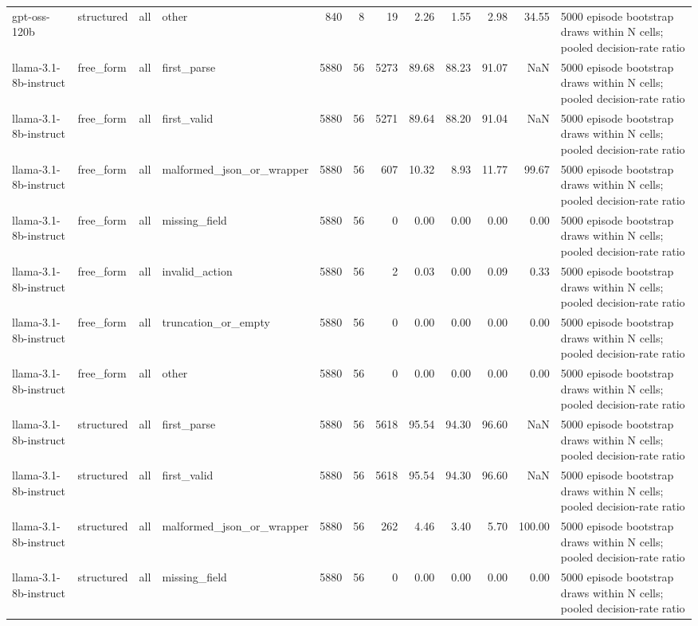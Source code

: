 \begin{tabular}{llllrrrrrrrl}
gpt-oss-120b & structured & all & other & 840 & 8 & 19 & 2.26 & 1.55 & 2.98 & 34.55 & 5000 episode bootstrap draws within N cells; pooled decision-rate ratio \\
llama-3.1-8b-instruct & free\_form & all & first\_parse & 5880 & 56 & 5273 & 89.68 & 88.23 & 91.07 & NaN & 5000 episode bootstrap draws within N cells; pooled decision-rate ratio \\
llama-3.1-8b-instruct & free\_form & all & first\_valid & 5880 & 56 & 5271 & 89.64 & 88.20 & 91.04 & NaN & 5000 episode bootstrap draws within N cells; pooled decision-rate ratio \\
llama-3.1-8b-instruct & free\_form & all & malformed\_json\_or\_wrapper & 5880 & 56 & 607 & 10.32 & 8.93 & 11.77 & 99.67 & 5000 episode bootstrap draws within N cells; pooled decision-rate ratio \\
llama-3.1-8b-instruct & free\_form & all & missing\_field & 5880 & 56 & 0 & 0.00 & 0.00 & 0.00 & 0.00 & 5000 episode bootstrap draws within N cells; pooled decision-rate ratio \\
llama-3.1-8b-instruct & free\_form & all & invalid\_action & 5880 & 56 & 2 & 0.03 & 0.00 & 0.09 & 0.33 & 5000 episode bootstrap draws within N cells; pooled decision-rate ratio \\
llama-3.1-8b-instruct & free\_form & all & truncation\_or\_empty & 5880 & 56 & 0 & 0.00 & 0.00 & 0.00 & 0.00 & 5000 episode bootstrap draws within N cells; pooled decision-rate ratio \\
llama-3.1-8b-instruct & free\_form & all & other & 5880 & 56 & 0 & 0.00 & 0.00 & 0.00 & 0.00 & 5000 episode bootstrap draws within N cells; pooled decision-rate ratio \\
llama-3.1-8b-instruct & structured & all & first\_parse & 5880 & 56 & 5618 & 95.54 & 94.30 & 96.60 & NaN & 5000 episode bootstrap draws within N cells; pooled decision-rate ratio \\
llama-3.1-8b-instruct & structured & all & first\_valid & 5880 & 56 & 5618 & 95.54 & 94.30 & 96.60 & NaN & 5000 episode bootstrap draws within N cells; pooled decision-rate ratio \\
llama-3.1-8b-instruct & structured & all & malformed\_json\_or\_wrapper & 5880 & 56 & 262 & 4.46 & 3.40 & 5.70 & 100.00 & 5000 episode bootstrap draws within N cells; pooled decision-rate ratio \\
llama-3.1-8b-instruct & structured & all & missing\_field & 5880 & 56 & 0 & 0.00 & 0.00 & 0.00 & 0.00 & 5000 episode bootstrap draws within N cells; pooled decision-rate ratio \\

\end{tabular}

